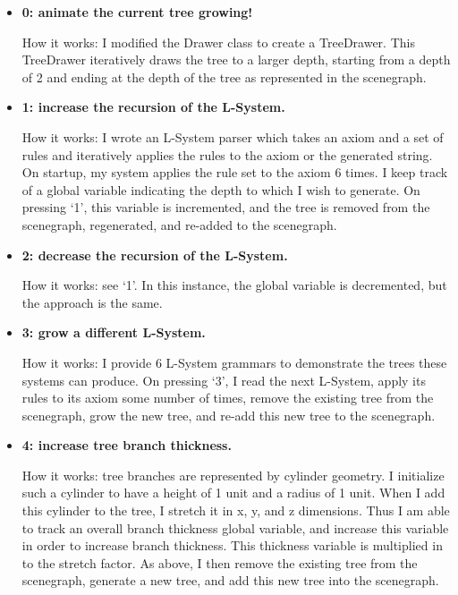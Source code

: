 \documentclass[11pt]{article} %
\begin{document}
\begin{itemize} 

\item \textbf{ 0: animate the current tree growing! }

How it works: I modified the Drawer class to create a TreeDrawer. This TreeDrawer iteratively draws the tree to a larger depth, starting from a depth of 2 and ending at the depth of the tree as represented in the scenegraph. 

\item  \textbf{1: increase the recursion of the L-System. }

How it works: I wrote an L-System parser which takes an axiom and a set of rules and iteratively applies the rules to the axiom or the generated string. On startup, my system applies the rule set to the axiom 6 times. I keep track of a global variable indicating the depth to which I wish to generate. On pressing `1', this variable is incremented, and the tree is removed from the scenegraph, regenerated, and re-added to the scenegraph. 

\item\textbf{ 2: decrease the recursion of the L-System. }

How it works: see `1'. In this instance, the global variable is decremented, but the approach is the same. 

\item \textbf{3: grow a different L-System. }

How it works: I provide 6 L-System grammars to demonstrate the trees these systems can produce. On pressing `3', I read the next L-System, apply its rules to its axiom some number of times, remove the existing tree from the scenegraph, grow the new tree, and re-add this new tree to the scenegraph. 

\item \textbf{4: increase tree branch thickness. }

How it works: tree branches are represented by cylinder geometry. I initialize such a cylinder to have a height of 1 unit and a radius of 1 unit. When I add this cylinder to the tree, I stretch it in x, y, and z dimensions. Thus I am able to track an overall branch thickness global variable, and increase this variable in order to increase branch thickness. This thickness variable is multiplied in to the stretch factor. As above, I then remove the existing tree from the scenegraph, generate a new tree, and add this new tree into the scenegraph. 


\end{itemize}
\end{document}
